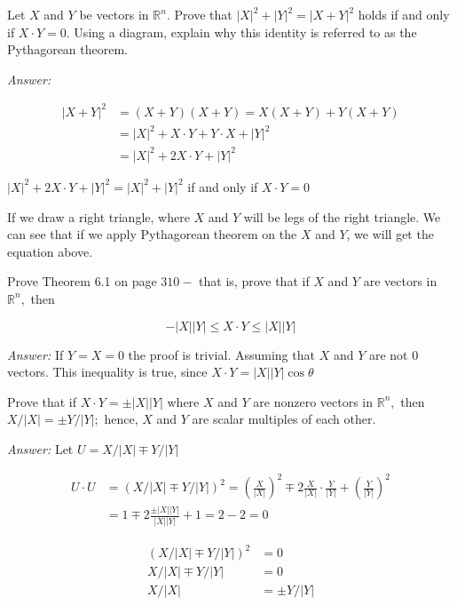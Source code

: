 \documentclass[letterpaper]{article}
\newcommand{\ans}{\textit{Answer: }}
\newenvironment{question}[2][Question]{\begin{trivlist}
\item[\hskip \labelsep {\bfseries #1}\hskip \labelsep {\bfseries #2.}]}{\end{trivlist}}
\begin{document}
\begin{question}{6.13}
  Let $X$ and $Y$ be vectors in $\mathbb{R}^{n} .$ Prove that $|X|^{2}+|Y|^{2}=|X+Y|^{2}$ holds if and
  only if $X \cdot Y=0 .$ Using a diagram, explain why this identity is referred to as
  the Pythagorean theorem.
  
  \ans 

  \begin{align*}
    |X+Y|^{2} &= (X+Y)(X+Y) = X(X+Y) + Y(X+Y) \\
    &= |X|^2 + X\cdot Y + Y\cdot X + |Y|^2 \\
    &= |X|^2 + 2X\cdot Y + |Y|^2
  \end{align*}

  $|X|^2 + 2X\cdot Y + |Y|^2 = |X|^{2}+|Y|^{2}$ if and only if $X \cdot Y=0$

  If we draw a right triangle, where $X$ and $Y$ will be legs of the right triangle.
  We can see that if we apply Pythagorean theorem on the $X$ and $Y$, we will get 
  the equation above. 
\end{question}

\begin{question}{6.14}
  Prove Theorem 6.1 on page $310-$ that is, prove that if $X$ and $Y$ are vectors in
  $\mathbb{R}^{n},$ then

  $$
  -|X||Y| \leq X \cdot Y \leq|X||Y|
  $$

  \ans If $Y = X = 0$ the proof is trivial. Assuming that $X$ and $Y$ are not 0 
  vectors. This inequality is true, since $X \cdot Y = |X| |Y| \cos \theta$
\end{question}

\begin{question}{6.15}
  Prove that if $X \cdot Y=\pm|X||Y|$ where $X$ and $Y$ are nonzero vectors in $\mathbb{R}^{n},$ then
  $X /|X|=\pm Y /|Y| ;$ hence, $X$ and $Y$ are scalar multiples of each other.
  
  \ans Let $U = X/|X| \mp Y/|Y|$

  \begin{align*}
    U\cdot U &= (X/|X| \mp Y/|Y|)^2
    = (\frac{X}{|X|})^2 \mp 2 \frac{X}{|X|} \cdot \frac{Y}{|Y|} + (\frac{Y}{|Y|})^2 \\
    &= 1 \mp 2 \frac{\pm|X||Y|}{|X||Y|} + 1 = 2 - 2 = 0
  \end{align*}

  \begin{align*}
    (X/|X| \mp Y/|Y|)^2 &= 0 \\ 
    X/|X| \mp Y/|Y| &= 0 \\
    X/|X| &= \pm Y/|Y|
  \end{align*}

\end{question}
\end{document}

